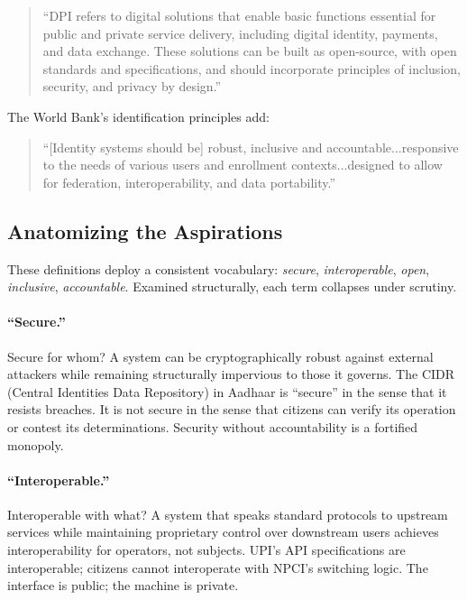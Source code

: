 \documentclass{article}
\begin{document}
\begin{quote}
``DPI refers to digital solutions that enable basic functions essential for public and private service delivery, including digital identity, payments, and data exchange. These solutions can be built as open-source, with open standards and specifications, and should incorporate principles of inclusion, security, and privacy by design.''
\end{quote}

The World Bank's identification principles add:

\begin{quote}
``[Identity systems should be] robust, inclusive and accountable...responsive to the needs of various users and enrollment contexts...designed to allow for federation, interoperability, and data portability.''
\end{quote}

\subsection{Anatomizing the Aspirations}

These definitions deploy a consistent vocabulary: \textit{secure}, \textit{interoperable}, \textit{open}, \textit{inclusive}, \textit{accountable}. Examined structurally, each term collapses under scrutiny.

\paragraph{``Secure.''}  Secure for whom? A system can be cryptographically robust against external attackers while remaining structurally impervious to those it governs. The CIDR (Central Identities Data Repository) in Aadhaar is ``secure'' in the sense that it resists breaches. It is not secure in the sense that citizens can verify its operation or contest its determinations. Security without accountability is a fortified monopoly.

\paragraph{``Interoperable.''}  Interoperable with what? A system that speaks standard protocols to upstream services while maintaining proprietary control over downstream users achieves interoperability for operators, not subjects. UPI's API specifications are interoperable; citizens cannot interoperate with NPCI's switching logic. The interface is public; the machine is private.
\end{document}
